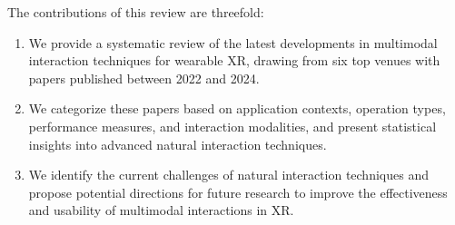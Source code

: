 \documentclass[review]{fcs}
\begin{document}
The contributions of this review are threefold:

\begin{enumerate}
\item We provide a systematic review of the latest developments in multimodal interaction techniques for wearable XR, drawing from six top venues with papers published between 2022 and 2024.

\item We categorize these papers based on application contexts, operation types, performance measures, and interaction modalities, and present statistical insights into advanced natural interaction techniques.

\item We identify the current challenges of natural interaction techniques and propose potential directions for future research to improve the effectiveness and usability of multimodal interactions in XR.
\end{enumerate}

\end{document}
